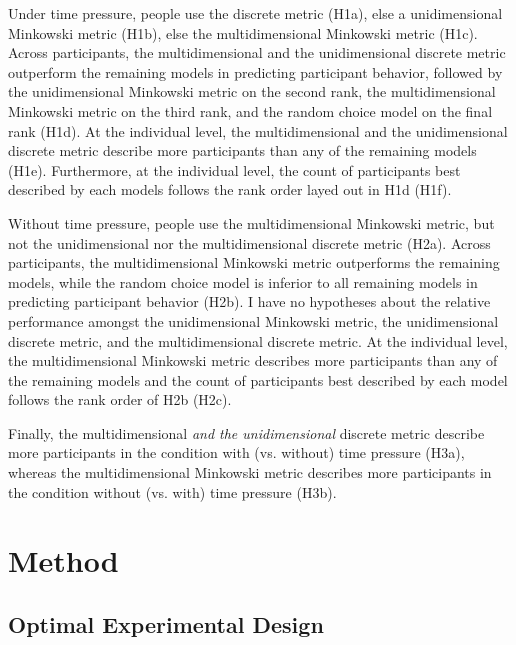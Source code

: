 \documentclass[a4paper,man,natbib]{apa6}
\begin{document}
Under time pressure, people use the discrete metric (H1a), else a unidimensional Minkowski metric (H1b), else the multidimensional Minkowski metric (H1c). Across participants, the multidimensional and the unidimensional discrete metric outperform the remaining models in predicting participant behavior, followed by the unidimensional Minkowski metric on the second rank, the multidimensional Minkowski metric on the third rank, and the random choice model on the final rank (H1d). At the individual level, the multidimensional and the unidimensional discrete metric describe more participants than any of the remaining models (H1e). Furthermore, at the individual level, the count of participants best described by each models follows the rank order layed out in H1d (H1f). 

Without time pressure, people use the multidimensional Minkowski metric, but not the unidimensional nor the multidimensional discrete metric (H2a). Across participants, the multidimensional Minkowski metric outperforms the remaining models, while the random choice model is inferior to all remaining models in predicting participant behavior (H2b). I have no hypotheses about the relative performance amongst the unidimensional Minkowski metric, the unidimensional discrete metric, and the multidimensional discrete metric. At the individual level, the multidimensional Minkowski metric describes more participants than any of the remaining models and the count of participants best described by each model follows the rank order of H2b (H2c). 

Finally, the multidimensional \textit{and the unidimensional} discrete metric describe more participants in the condition with (vs. without) time pressure (H3a), whereas the multidimensional Minkowski metric describes more participants in the condition without (vs. with) time pressure (H3b).

\section{Method}

\subsection{Optimal Experimental Design}
\end{document}
